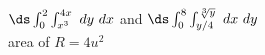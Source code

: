 {\noindent \begin{minipage}{\linewidth}
\end{minipage}
}
{$\ds\int_0^{2}\int_{x^3}^{4{x}}\ dy\ dx$ and $\ds\int_{0}^8\int_{y/4}^{\sqrt[3]{y}}\ dx\ dy$\\
area  of $R = 4u^2$
}
